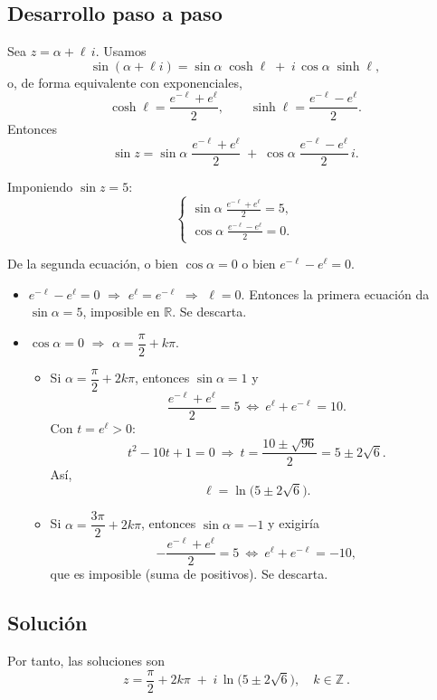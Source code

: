 \documentclass[fleqn]{article}
\begin{document}
\subsection*{Desarrollo paso a paso}
Sea $z=\alpha+\ell\,i$. Usamos
\[
\sin(\alpha+\ell i)=\sin\alpha\;\cosh\ell\;+\;i\,\cos\alpha\;\sinh\ell,
\]
o, de forma equivalente con exponenciales,
\[
\cosh\ell=\frac{e^{-\ell}+e^{\ell}}{2},\qquad
\sinh\ell=\frac{e^{-\ell}-e^{\ell}}{2}.
\]
Entonces
\[
\sin z
=\sin\alpha\;\frac{e^{-\ell}+e^{\ell}}{2}
\;+\; \cos\alpha\;\frac{e^{-\ell}-e^{\ell}}{2}\,i.
\]

Imponiendo $\sin z=5$:
\[
\begin{cases}
\displaystyle \sin\alpha\;\frac{e^{-\ell}+e^{\ell}}{2}=5,\\[6pt]
\displaystyle \cos\alpha\;\frac{e^{-\ell}-e^{\ell}}{2}=0.
\end{cases}
\]

De la segunda ecuación, o bien $\cos\alpha=0$ o bien $e^{-\ell}-e^{\ell}=0$.

\begin{itemize}
\item \underline{$e^{-\ell}-e^{\ell}=0$} $\Rightarrow$ $e^{\ell}=e^{-\ell}$ $\Rightarrow$ $\ell=0$.  
Entonces la primera ecuación da $\sin\alpha=5$, imposible en $\mathbb{R}$. Se descarta.

\item \underline{$\cos\alpha=0$} $\Rightarrow$ $\alpha=\dfrac{\pi}{2}+k\pi$.

\begin{itemize}
\item Si $\alpha=\dfrac{\pi}{2}+2k\pi$, entonces $\sin\alpha=1$ y
\[
\frac{e^{-\ell}+e^{\ell}}{2}=5 \ \Longleftrightarrow\ e^{\ell}+e^{-\ell}=10.
\]
Con $t=e^{\ell}>0$:
\[
t^2-10t+1=0 \ \Longrightarrow\ t=\frac{10\pm\sqrt{96}}{2}=5\pm2\sqrt{6}.
\]
Así,
\[
\ell=\ln\!\big(5\pm2\sqrt{6}\big).
\]

\item Si $\alpha=\dfrac{3\pi}{2}+2k\pi$, entonces $\sin\alpha=-1$ y exigiría
\[
-\frac{e^{-\ell}+e^{\ell}}{2}=5 \ \Longleftrightarrow\ e^{\ell}+e^{-\ell}=-10,
\]
que es imposible (suma de positivos). Se descarta.
\end{itemize}
\end{itemize}

\subsection*{Solución}
Por tanto, las soluciones son
\[
\boxed{\ z=\frac{\pi}{2}+2k\pi \;+\; i\,\ln\!\big(5\pm2\sqrt{6}\big),\quad k\in\mathbb{Z}\ }.
\]
\end{document}
